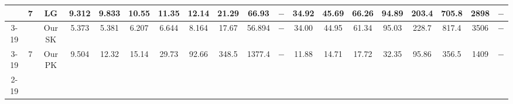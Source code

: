 \begin{table}[]
{\begin{tabular}{|c|c|c|cccccccccccccccc|}
& \multirow{3}{*}{7} & LG & \multicolumn{1}{c|}{9.312} & \multicolumn{1}{c|}{9.833} & \multicolumn{1}{c|}{10.55} & \multicolumn{1}{c|}{11.35} & \multicolumn{1}{c|}{12.14} & \multicolumn{1}{c|}{21.29} & \multicolumn{1}{c|}{66.93} & \multicolumn{1}{c|}{$-$} & \multicolumn{1}{c|}{34.92} & \multicolumn{1}{c|}{45.69} & \multicolumn{1}{c|}{66.26} & \multicolumn{1}{c|}{94.89} & \multicolumn{1}{c|}{203.4} & \multicolumn{1}{c|}{705.8} & \multicolumn{1}{c|}{2898} & $-$ \\ \cline{3-19} 
 &  & Our SK & \multicolumn{1}{c|}{\cellcolor{blue!30}5.373} & \multicolumn{1}{c|}{\cellcolor{blue!30}5.381} & \multicolumn{1}{c|}{\cellcolor{blue!30}6.207} & \multicolumn{1}{c|}{\cellcolor{blue!30}6.644} & \multicolumn{1}{c|}{\cellcolor{blue!30}8.164} & \multicolumn{1}{c|}{\cellcolor{blue!30}17.67} & \multicolumn{1}{c|}{\cellcolor{blue!30}56.894} & \multicolumn{1}{c|}{$-$} & \multicolumn{1}{c|}{34.00} & \multicolumn{1}{c|}{44.95} & \multicolumn{1}{c|}{61.34} & \multicolumn{1}{c|}{95.03} & \multicolumn{1}{c|}{228.7} & \multicolumn{1}{c|}{817.4} & \multicolumn{1}{c|}{3506} & $-$ \\ \cline{3-19} 
 & \multirow{-3}{*}{7} & Our PK & \multicolumn{1}{c|}{9.504} & \multicolumn{1}{c|}{12.32} & \multicolumn{1}{c|}{15.14} & \multicolumn{1}{c|}{29.73} & \multicolumn{1}{c|}{92.66} & \multicolumn{1}{c|}{348.5} & \multicolumn{1}{c|}{1377.4} & \multicolumn{1}{c|}{$-$} & \multicolumn{1}{c|}{\cellcolor{blue!30}11.88} & \multicolumn{1}{c|}{\cellcolor{blue!30}14.71} & \multicolumn{1}{c|}{\cellcolor{blue!30}17.72} & \multicolumn{1}{c|}{\cellcolor{blue!30}32.35} & \multicolumn{1}{c|}{\cellcolor{blue!30}95.86} & \multicolumn{1}{c|}{\cellcolor{blue!30}356.5} & \multicolumn{1}{c|}{\cellcolor{blue!30}1409} & $-$ \\ \cline{2-19} 


\end{tabular}}
\end{table}
